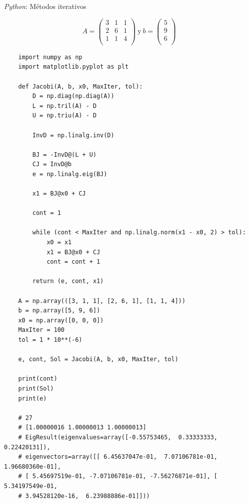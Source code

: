 \textit{Python}: M\'etodos iterativos

$$A = 
	\begin{pmatrix}
        3 & 1 & 1\\
        2 & 6 & 1\\
        1 & 1 & 4\\
	\end{pmatrix}
	\ \text{y}\ b =
	\begin{pmatrix}
        5\\
        9\\
        6\\
	\end{pmatrix}
$$

\begin{verbatim}
	import numpy as np
	import matplotlib.pyplot as plt
			
	def Jacobi(A, b, x0, MaxIter, tol):
	    D = np.diag(np.diag(A))
	    L = np.tril(A) - D
	    U = np.triu(A) - D
	    
	    InvD = np.linalg.inv(D)
	    
	    BJ = -InvD@(L + U)
	    CJ = InvD@b
	    e = np.linalg.eig(BJ)
	    
	    x1 = BJ@x0 + CJ
	    
	    cont = 1
	    
	    while (cont < MaxIter and np.linalg.norm(x1 - x0, 2) > tol):
	        x0 = x1
	        x1 = BJ@x0 + CJ
	        cont = cont + 1
	        
	    return (e, cont, x1)
	    
	A = np.array(([3, 1, 1], [2, 6, 1], [1, 1, 4]))
	b = np.array([5, 9, 6])
	x0 = np.array([0, 0, 0])
	MaxIter = 100
	tol = 1 * 10**(-6)
	
	e, cont, Sol = Jacobi(A, b, x0, MaxIter, tol)
	
	print(cont)
	print(Sol)
	print(e)
	
	# 27
	# [1.00000016 1.00000013 1.00000013]
	# EigResult(eigenvalues=array([-0.55753465,  0.33333333,  0.22420131]), 
	# eigenvectors=array([[ 6.45637047e-01,  7.07106781e-01,  1.96680360e-01],
	# [ 5.45697519e-01, -7.07106781e-01, -7.56276871e-01], [ 5.34197549e-01,
	# 3.94528120e-16,  6.23988886e-01]]))
\end{verbatim}